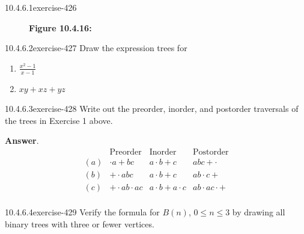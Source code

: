 \documentclass[twoside,10pt,]{book}
\numberwithin{equation}{section}
\begin{document}
\begin{divisionsolution}{10.4.6.1}{}{exercise-426}
\begin{figure}
\caption*{\textbf{Figure 10.4.16:} }
\end{figure}
\end{divisionsolution}%
\begin{divisionsolution}{10.4.6.2}{}{exercise-427}%
\hypertarget{p-3743}{}%
Draw the expression trees for%
\par
\hypertarget{p-3744}{}%
\leavevmode%
\begin{enumerate}[label=(\alph*)]
\item\hypertarget{li-1724}{}\hypertarget{p-3745}{}%
\(\frac{x^2-1}{x-1}\)%
\item\hypertarget{li-1725}{}\hypertarget{p-3746}{}%
\(x y + x z + y z\)%
\end{enumerate}
%
\end{divisionsolution}%
\begin{divisionsolution}{10.4.6.3}{}{exercise-428}%
\hypertarget{p-3747}{}%
Write out the preorder, inorder, and postorder traversals of the trees in Exercise 1 above.%
\par\smallskip%
\noindent\textbf{Answer}.\quad%
\hypertarget{p-3748}{}%
%
\begin{equation*}
\begin{array}{cccc}
& \text{Preorder}  & \text{Inorder} & \text{Postorder} \\
(a) & \cdot a + b c & a\cdot b+c &  a b c + \cdot \\
(b) & +\cdot a b c & a\cdot b+c & a b\cdot c+ \\
(c) & +\cdot a b\cdot a c & a\cdot b+a\cdot c & a b\cdot a c\cdot +  \\
\end{array}
\end{equation*}
%
\end{divisionsolution}%
\begin{divisionsolution}{10.4.6.4}{}{exercise-429}%
\hypertarget{p-3749}{}%
Verify the formula for \(B(n)\), \(0 \leq  n \leq  3\) by drawing all binary trees with three or fewer vertices.%
\end{divisionsolution}%
\end{document}
